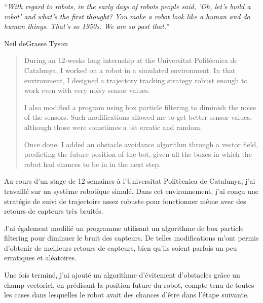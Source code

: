\documentclass[
12pt, %
oneside, %
english, %
singlespacing, %
liststotoc, %
toctotoc, %
headsepline, %
]{MastersDoctoralThesis} %
\begin{document}


\vspace*{0.2\textheight}

\noindent\enquote{\itshape With regard to robots, in the early days of robots people said, 'Oh, let's build a robot' and what's the first thought? You make a robot look like a human and do human things. That's so 1950s. We are so past that.}\bigbreak

\hfill Neil deGrasse Tyson


\begin{abstract}
\addchaptertocentry{\abstractname} %
During an 12-weeks long internship at the Universitat Politècnica de Catalunya, I worked on a robot in a simulated environment.
In that environment, I designed a trajectory tracking strategy robust enough to work even with very noisy sensor values.

I also modified a program using box particle filtering to diminish the noise of the sensors.
Such modifications allowed me to get better sensor values, although those were sometimes a bit erratic and random.

Once done, I added an obstacle avoidance algorithm through a vector field, predicting the future position of the bot, given all the boxes in which the robot had chances to be in in the next step.
\end{abstract}

\begin{resume}
\addchaptertocentry{\resumename}
Au cours d'un stage de 12 semaines à l'Universitat Politècnica de Catalunya, j'ai travaillé sur un système robotique simulé.
Dans cet environnement, j'ai conçu une stratégie de suivi de trajectoire assez robuste pour fonctionner même avec des retours de capteurs très bruités.

J'ai également modifié un programme utilisant un algorithme de box particle filtering pour diminuer le bruit des capteurs.
De telles modifications m'ont permis d'obtenir de meilleurs retours de capteurs, bien qu'ils soient parfois un peu erratiques et aléatoires.

Une fois terminé, j'ai ajouté un algorithme d'évitement d'obstacles grâce un champ vectoriel, en prédisant la position future du robot, compte tenu de toutes les cases dans lesquelles le robot avait des chances d'être dans l'étape suivante.
\end{resume}
\end{document}
